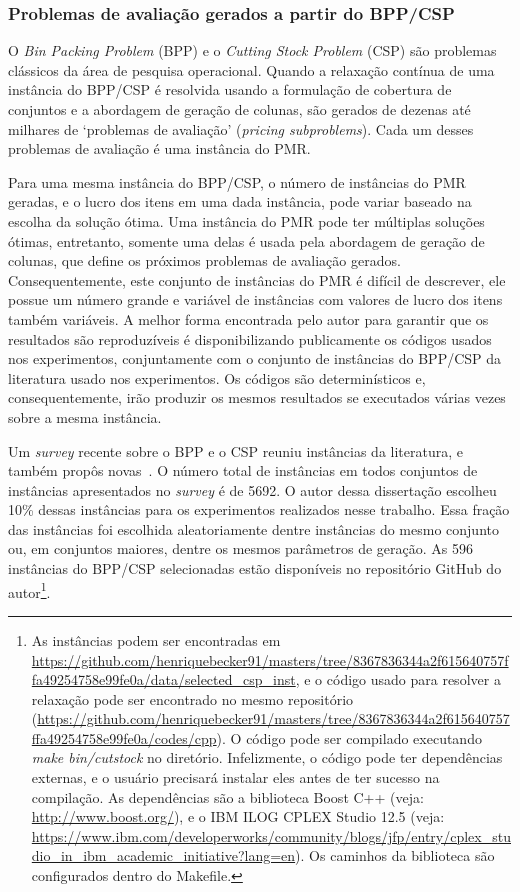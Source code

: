 \subsubsection{Problemas de avaliação gerados a partir do BPP/CSP}

O \emph{Bin Packing Problem} (BPP) e o \emph{Cutting Stock Problem} (CSP) são problemas clássicos da área de pesquisa operacional.
Quando a relaxação contínua de uma instância do BPP/CSP é resolvida usando a formulação de cobertura de conjuntos e a abordagem de geração de colunas, são gerados de dezenas até milhares de `problemas de avaliação' (\emph{pricing subproblems}).
Cada um desses problemas de avaliação é uma instância do PMR.

Para uma mesma instância do BPP/CSP, o número de instâncias do PMR geradas, e o lucro dos itens em uma dada instância, pode variar baseado na escolha da solução ótima.
Uma instância do PMR pode ter múltiplas soluções ótimas, entretanto, somente uma delas é usada pela abordagem de geração de colunas, que define os próximos problemas de avaliação gerados.
Consequentemente, este conjunto de instâncias do PMR é difícil de descrever, ele possue um número grande e variável de instâncias com valores de lucro dos itens também variáveis.
A melhor forma encontrada pelo autor para garantir que os resultados são reproduzíveis é disponibilizando publicamente os códigos usados nos experimentos, conjuntamente com o conjunto de instâncias do BPP/CSP da literatura usado nos experimentos.
Os códigos são determinísticos e, consequentemente, irão produzir os mesmos resultados se executados várias vezes sobre a mesma instância.

Um \emph{survey} recente sobre o BPP e o CSP reuniu instâncias da literatura, e também propôs novas~\cite{survey2014}.
O número total de instâncias em todos conjuntos de instâncias apresentados no \emph{survey} é de 5692.
O autor dessa dissertação escolheu 10\% dessas instâncias para os experimentos realizados nesse trabalho.
Essa fração das instâncias foi escolhida aleatoriamente dentre instâncias do mesmo conjunto ou, em conjuntos maiores, dentre os mesmos parâmetros de geração.
As 596 instâncias do BPP/CSP selecionadas estão disponíveis no repositório GitHub do autor\footnote{As instâncias podem ser encontradas em \url{https://github.com/henriquebecker91/masters/tree/8367836344a2f615640757ffa49254758e99fe0a/data/selected_csp_inst}, e o código usado para resolver a relaxação pode ser encontrado no mesmo repositório (\url{https://github.com/henriquebecker91/masters/tree/8367836344a2f615640757ffa49254758e99fe0a/codes/cpp}).
O código pode ser compilado executando  \emph{make bin/cutstock} no diretório.
Infelizmente, o código pode ter dependências externas, e o usuário precisará instalar eles antes de ter sucesso na compilação.
As dependências são a biblioteca Boost C++ (veja: \url{http://www.boost.org/}), e o IBM ILOG CPLEX Studio 12.5 (veja: \url{https://www.ibm.com/developerworks/community/blogs/jfp/entry/cplex_studio_in_ibm_academic_initiative?lang=en}).
Os caminhos da biblioteca são configurados dentro do Makefile.}.

